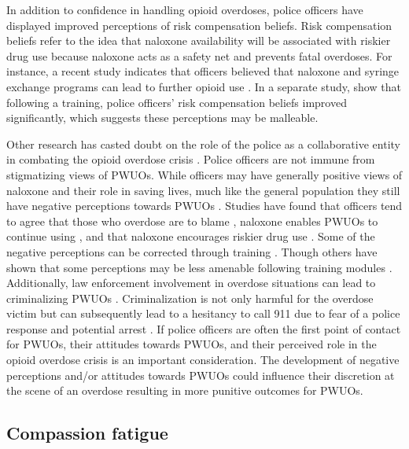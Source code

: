 In addition to confidence in handling opioid overdoses, police officers have displayed improved perceptions of risk compensation beliefs. Risk compensation beliefs refer to the idea that naloxone availability will be associated with riskier drug use because naloxone acts as a safety net and prevents fatal overdoses. For instance, a recent study indicates that officers believed that naloxone and syringe exchange programs can lead to further opioid use \parencite{reichert_police_2023}. In a separate study, \textcite{winograd_concerns_2019} show that following a training, police officers' risk compensation beliefs improved significantly, which suggests these perceptions may be malleable.

Other research has casted doubt on the role of the police as a collaborative entity in combating the opioid overdose crisis \parencite{carroll_police_2023}. Police officers are not immune from stigmatizing views of PWUOs. While officers may have generally positive views of naloxone and their role in saving lives, much like the general population they still have negative perceptions towards PWUOs \parencite{barry_stigma_2014, calabrese_opposition_2019}. Studies have found that officers tend to agree that those who overdose are to blame \parencite{beletsky_attitudes_2005, wagner_training_2016}, naloxone enables PWUOs to continue using \parencite{banta-green_police_2013, burris_stopping_2009, reichert_police_2023}, and that naloxone encourages riskier drug use \parencite{saunders_you_2019}. Some of the negative perceptions can be corrected through training \parencite{winograd_concerns_2019}. Though others have shown that some perceptions may be less amenable following training modules \parencite{wagner_training_2016}. Additionally, law enforcement involvement in overdose situations can lead to criminalizing PWUOs \parencite{lowder_twoyear_2020, van_der_meulen_thats_2021}. Criminalization is not only harmful for the overdose victim but can subsequently lead to a hesitancy to call 911 due to fear of a police response and potential arrest \parencite{bohnert_policing_2011}. If police officers are often the first point of contact for PWUOs, their attitudes towards PWUOs, and their perceived role in the opioid overdose crisis is an important consideration. The development of negative perceptions and/or attitudes towards PWUOs could influence their discretion at the scene of an overdose resulting in more punitive outcomes for PWUOs.

\subsection{Compassion fatigue}

